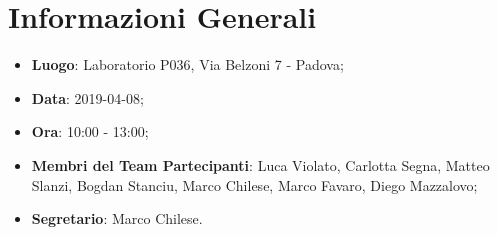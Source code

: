 \section{Informazioni Generali}
\begin{itemize}
	\item \textbf{Luogo}: Laboratorio P036, Via Belzoni 7 - Padova; 
	\item \textbf{Data}: 2019-04-08;
	\item \textbf{Ora}: 10:00 - 13:00;
	\item \textbf{Membri del Team Partecipanti}: Luca Violato, Carlotta Segna, Matteo Slanzi, Bogdan Stanciu, Marco Chilese, Marco Favaro, Diego Mazzalovo; 
	\item \textbf{Segretario}: Marco Chilese. 
\end{itemize}


